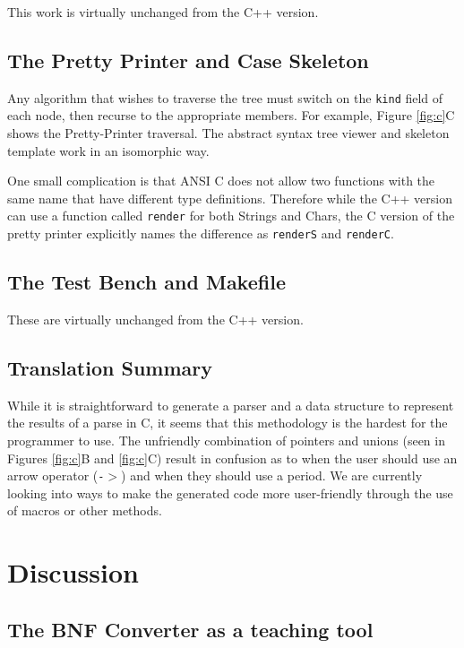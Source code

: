 \documentclass{llncs}
\begin{document}
This work is virtually unchanged from the C++ version.

\subsection{The Pretty Printer and Case Skeleton}

Any algorithm that wishes to traverse the tree must switch on the \texttt{kind} field of each node, then recurse to the appropriate members. For example, Figure \ref{fig:c}C shows the Pretty-Printer traversal. The abstract syntax tree viewer and skeleton template work in an isomorphic way.

One small complication is that ANSI C does not allow two functions with the same name that have different type definitions. Therefore while the C++ version can use a function called \texttt{render} for both Strings and Chars, the C version of the pretty printer explicitly names the difference as \texttt{renderS} and \texttt{renderC}.

\subsection{The Test Bench and Makefile}

These are virtually unchanged from the C++ version.

\subsection{Translation Summary}

While it is straightforward to generate a parser and a data structure to represent the results of a parse in C, it seems that this methodology is the hardest for the programmer to use. The unfriendly combination of pointers and unions (seen in Figures \ref{fig:c}B and \ref{fig:c}C) result in confusion as to when the user should use an arrow operator (\texttt{-$>$}) and when they should use a period. We are currently looking into ways to make the generated code more user-friendly through the use of macros or other methods.




\section{Discussion}

\subsection{The BNF Converter as a teaching tool}
\end{document}
